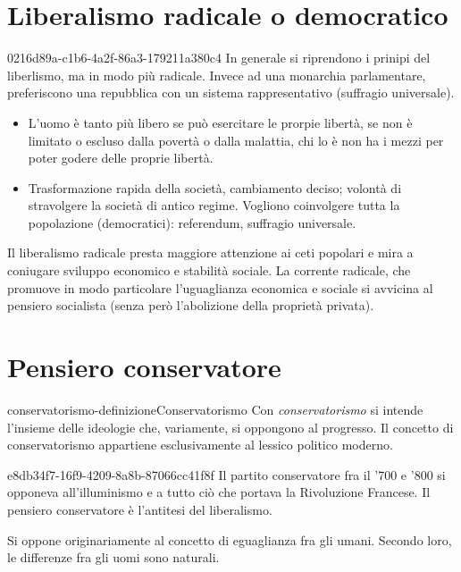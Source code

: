 \documentclass[preview]{standalone}
\begin{document}
\section{Liberalismo radicale o democratico}

\begin{snippet}{0216d89a-c1b6-4a2f-86a3-179211a380c4}
    In generale si riprendono i prinipi del liberlismo, ma in modo più radicale.
    Invece ad una monarchia parlamentare, preferiscono una repubblica con un sistema rappresentativo (suffragio universale).

    \begin{itemize}
        \item L'uomo è tanto più libero se può esercitare le prorpie libertà, se non è limitato o escluso dalla povertà o dalla malattia, chi lo è non ha i mezzi per poter godere delle proprie libertà.
        \item Trasformazione rapida della società, cambiamento deciso; volontà di stravolgere la società di antico regime. Vogliono coinvolgere tutta la popolazione (democratici): referendum, suffragio universale.
    \end{itemize}

    Il liberalismo radicale presta maggiore attenzione ai ceti popolari e mira a coniugare sviluppo
    economico e stabilità sociale. La corrente radicale, che promuove in modo particolare
    l'uguaglianza economica e sociale si avvicina al pensiero socialista (senza però l'abolizione della
    proprietà privata).
\end{snippet}

\section{Pensiero conservatore}

\begin{snippetdefinition}{conservatorismo-definizione}{Conservatorismo}
    Con \textit{conservatorismo} si intende l'insieme delle ideologie che, variamente, si oppongono al progresso. Il
    concetto di conservatorismo appartiene esclusivamente al lessico politico moderno.
\end{snippetdefinition}

\begin{snippet}{e8db34f7-16f9-4209-8a8b-87066cc41f8f}
    Il partito conservatore fra il '700 e '800 si opponeva all'illuminismo e a tutto ciò che portava la Rivoluzione Francese.
    Il pensiero conservatore è l'antitesi del liberalismo.

    Si oppone originariamente al concetto di eguaglianza fra gli umani. Secondo loro, le differenze fra gli uomi sono naturali.
\end{snippet}
\end{document}
